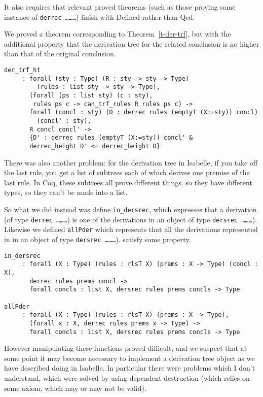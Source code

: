 \documentclass[a4paper,12pt]{llncs}
\begin{document}
It also requires that relevant proved theorems 
(such as those proving some instance of \texttt{derrec \ldots \ldots \ldots})
finish with Defined rather than Qed.

We proved a theorem corresponding to Theorem~\ref{t-der-trf},
but with the additional property that the derivation tree for the 
related conclusion is no higher than that of the original conclusion.
\begin{verbatim}
der_trf_ht
     : forall (sty : Type) (R : sty -> sty -> Type)
         (rules : list sty -> sty -> Type),
       (forall (ps : list sty) (c : sty),
        rules ps c -> can_trf_rules R rules ps c) ->
       forall (concl : sty) (D : derrec rules (emptyT (X:=sty)) concl)
         (concl' : sty),
       R concl concl' ->
       {D' : derrec rules (emptyT (X:=sty)) concl' &
       derrec_height D' <= derrec_height D}
\end{verbatim}

There was also another problem: for the derivation tree in Isabelle, if you
take off the last rule, you get a list of subtrees each of which derives one
premise of the last rule.
In Coq, these subtrees all prove different things, so they have different
types, so they can't be made into a list.

So what we did instead was define \texttt{in\_dersrec}, 
which expresses that a derivation 
(of type \texttt{derrec \ldots \ldots \ldots})
is one of the derivations in an object of type 
\texttt{dersrec \ldots \ldots \ldots}).
Likewise we defined \texttt{allPder}
which represents that all the derivations represented 
in in an object of type \texttt{dersrec \ldots \ldots \ldots}).
satisfy some property.
\begin{verbatim}
in_dersrec
     : forall (X : Type) (rules : rlsT X) (prems : X -> Type) (concl : X),
       derrec rules prems concl ->
       forall concls : list X, dersrec rules prems concls -> Type

allPder
     : forall (X : Type) (rules : rlsT X) (prems : X -> Type),
       (forall x : X, derrec rules prems x -> Type) ->
       forall concls : list X, dersrec rules prems concls -> Type
\end{verbatim}

However manipulating these functions proved difficult, 
and we suspect that at some point it may become necessary to
implement a derivation tree object as we have described doing in Isabelle.
In particular there were problems which I don't understand,
 which were solved by using dependent destruction 
(which relies on some axiom, which may or may not be valid).
\end{document}
